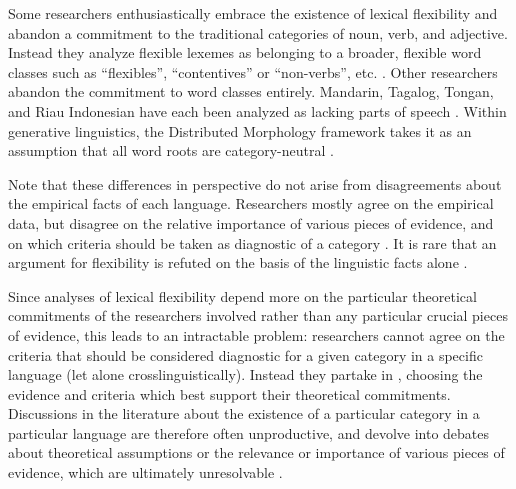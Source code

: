 Some researchers enthusiastically embrace the existence of lexical flexibility and abandon a commitment to the traditional categories of noun, verb, and adjective. Instead they analyze flexible lexemes as belonging to a broader, flexible word classes such as \enquote{flexibles}, \enquote{contentives} or \enquote{non-verbs}, etc. . Other researchers abandon the commitment to word classes entirely. Mandarin, Tagalog, Tongan, and Riau Indonesian have each been analyzed as lacking parts of speech . Within generative linguistics, the Distributed Morphology framework takes it as an assumption that all word roots are category-neutral .

Note that these differences in perspective do not arise from disagreements about the empirical facts of each language. Researchers mostly agree on the empirical data, but disagree on the relative importance of various pieces of evidence, and on which criteria should be taken as diagnostic of a category .  It is rare that an argument for flexibility is refuted on the basis of the linguistic facts alone .

Since analyses of lexical flexibility depend more on the particular theoretical commitments of the researchers involved rather than any particular crucial pieces of evidence, this leads to an intractable problem: researchers cannot agree on the criteria that should be considered diagnostic for a given category in a specific language (let alone crosslinguistically). Instead they partake in  , choosing the evidence and criteria which best support their theoretical commitments. Discussions in the literature about the existence of a particular category in a particular language are therefore often unproductive, and devolve into debates about theoretical assumptions or the relevance or importance of various pieces of evidence, which are ultimately unresolvable .


